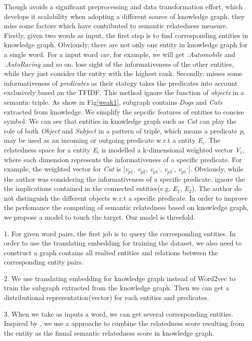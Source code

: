 Though \cite{aaai/Pirro12} avoids a significant preprocessing and data
transformation effort, which develops it scalability when adopting a
different source of knowledge graph, they miss some factors which
have contributed to semantic relatedness measure. Firstly, given two words
as input, the first step is to find corresponding entities in knowledge
graph. Obviously, there are not only one entity in knowledge graph for a single
word. For a input word \emph{car}, for example, we will get \emph{:Automobile} and
\emph{:Auto\underline{\hspace{0.5em}}Racing} and so on. \cite{aaai/Pirro12} lose
sight of the informativeness of the other entities, while they just
consider the entity with the highest rank. Secondly, \cite{aaai/Pirro12} misses
some informativeness of \emph{predicates} as their stategy takes
the predicates into account exclusively based on the TFIDF. This
method ignore the function of \emph{objects} in a semantic triple.
As show in Fig\ref{weak1}, subgraph contains \emph{Dogs} and \emph{Cats} extracted from
knowledge. We simplify the sepcific features of entities to concise symbol. 
We can see that entities in knowledge graph such as \emph{Cat} can play the role 
of both \emph{Object} and \emph{Subject} in a pattern of triple, which means a predicate 
\emph{p$_i$} may be used as an incoming or outgoing predicate w.r.t a entity
\emph{E$_i$}. The relatedness space for a entity \emph{E$_i$} is modelled a 
k-dimensional weighted vector \emph{V$_i$}, where each dimension represents
the informativeness of a specific predicate\cite{BudanitskyH06}. For example, the weighted
vector for \emph{Cat} is 
[\emph{v$_{p1}$}, \emph{v$_{p2}$}, \emph{v$_{p1}$$^,$}, \emph{v$_{p2}$$^,$}, \emph{v$_{p1}$$^,$}]. 
Obviously, while the author was considering the informativeness of a specific 
predicate, ignore the the implications contained in the connected entities(e.g.
\emph{E$_1$}, \emph{E$_2$}). The author do not distinguish the different 
objects w.r.t a specific predicate. In order to improve the perfomance the computing
of semantic relatedness based on knowledge graph, we propose a model to touch 
the target. Our model is threefold.

1. For given word pairs, the first job is to query
the corresponding entities. In order to use the
translating embedding for training the dataset, we
also need to construct a graph contains all realted
entities and relations between the corresponding
entity pairs.

2. We use translating embedding for knowledge
graph instead of Word2vec to train the subgraph
extracted from the knowledge graph. Then we can
get a distributional representation(vector) for each
entities and predicates. 

3. When we take as inputs a word, we can get several 
corresponding entities. Inspired by \cite{acl/IacobacciPN15}, we use 
a approache to combine the relatedness score resulting from the
entity as the finnal semantic relatedness score in knowledge graph.